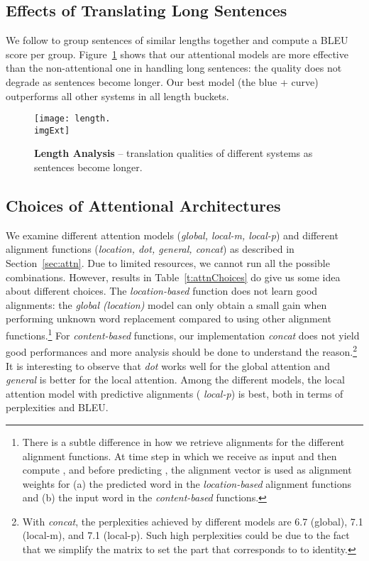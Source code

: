 \documentclass[11pt,a4paper]{article}
\newcommand{\imgExt}{eps}
\newcommand{\MB}[1]{\mbox{\boldmath{}}} \newcommand{\inR}[1]{\in \mathbb{R}^{#1}}
\begin{document}
\subsection{Effects of Translating Long Sentences}
We follow \cite{bog15} to group sentences of similar lengths together and
compute a BLEU score per group. Figure~\ref{f:length} shows that
our attentional models are more effective than the non-attentional one in
handling long sentences: the quality does not degrade as sentences
become longer. Our best model (the blue + curve) outperforms all other systems in all length buckets.

\begin{figure}[tbh!]
\centering
\texttt{[image: length.\\imgExt]} \caption{{\bf Length Analysis} -- translation qualities of different
systems as sentences become longer.
} 
\label{f:length}
\end{figure}

\subsection{Choices of Attentional Architectures}
We examine different attention models ({\it global, local-m, local-p}) and different
alignment functions ({\it location, dot, general, concat}) as described in
Section~\ref{sec:attn}. Due to limited
resources, we cannot run all the possible combinations.
However, results in Table~\ref{t:attnChoices} do give us some idea about
different choices. 
The {\it location-based} function does not learn good
alignments: the {\it global (location)} model can only obtain a small
gain when performing unknown word replacement compared to using other alignment
functions.\footnote{There is a subtle difference in how we retrieve alignments
for the different alignment functions. At time step  in which we receive
 as input and then compute , and  before
predicting , the alignment vector  is used as alignment
weights for (a) the predicted word  in the {\it location-based}
alignment functions and (b) the input word  in the {\it content-based}
functions.}
For {\it content-based} functions, our implementation {\it concat} does not yield good performances
and more analysis should be done to understand the
reason.\footnote{With {\it concat}, the perplexities achieved by different models are 6.7 (global), 7.1
(local-m), and 7.1 (local-p). Such high perplexities could be due to the fact
that we simplify the matrix \MB{W_a} to set the part that corresponds to 
to identity.} It is interesting to observe that {\it dot} works
well for the global attention and {\it general} is better for the local
attention.
Among the different models, the local attention model with predictive alignments ({\it
local-p}) is best, both in terms of perplexities and BLEU.
\end{document}
